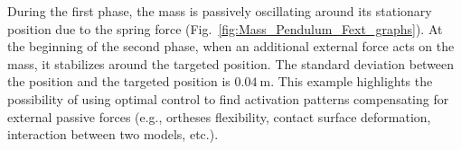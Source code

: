 During the first phase, the mass is passively oscillating around its stationary position due to the spring force (Fig.~\ref{fig:Mass_Pendulum_Fext_graphs}).
At the beginning of the second phase, when an additional external force acts on the mass, it stabilizes around the targeted position.
The standard deviation between the position and the targeted position is $\SI{0.04}{\m}$.
This example highlights the possibility of using optimal control to find activation patterns compensating for external passive forces (e.g., ortheses flexibility, contact surface deformation, interaction between two models, etc.).
\newpage


